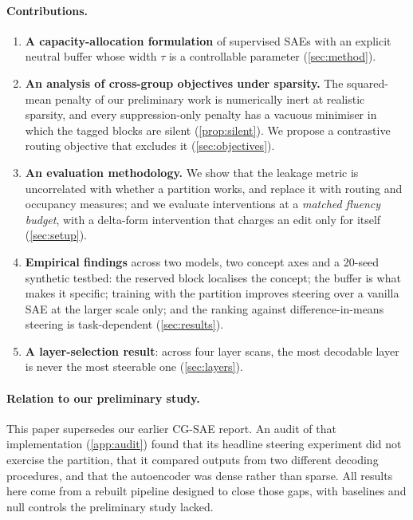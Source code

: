 \documentclass[11pt,a4paper]{article}
\theoremstyle{remark}
\begin{document}
\paragraph{Contributions.}
\begin{enumerate}
  \item \textbf{A capacity-allocation formulation} of supervised SAEs with an explicit neutral
        buffer whose width $\tau$ is a controllable parameter (\cref{sec:method}).
  \item \textbf{An analysis of cross-group objectives under sparsity.} The squared-mean penalty
        of our preliminary work is numerically inert at realistic sparsity, and every
        suppression-only penalty has a vacuous minimiser in which the tagged blocks are
        silent (\cref{prop:silent}). We propose a contrastive routing objective that excludes
        it (\cref{sec:objectives}).
  \item \textbf{An evaluation methodology.} We show that the leakage metric is uncorrelated with
        whether a partition works, and replace it with routing and occupancy measures; and we
        evaluate interventions at a \emph{matched fluency budget}, with a delta-form
        intervention that charges an edit only for itself (\cref{sec:setup}).
  \item \textbf{Empirical findings} across two models, two concept axes and a 20-seed synthetic
        testbed: the reserved block localises the concept; the buffer is what makes it
        specific; training with the partition improves steering over a vanilla SAE at the
        larger scale only; and the ranking against difference-in-means steering is task-dependent
        (\cref{sec:results}).
  \item \textbf{A layer-selection result}: across four layer scans, the most decodable layer is
        never the most steerable one (\cref{sec:layers}).
\end{enumerate}

\paragraph{Relation to our preliminary study.}
This paper supersedes our earlier CG-SAE report. An audit of that implementation
(\cref{app:audit}) found that its headline steering experiment did not exercise the partition,
that it compared outputs from two different decoding procedures, and that the autoencoder was
dense rather than sparse. All results here come from a rebuilt pipeline designed to close
those gaps, with baselines and null controls the preliminary study lacked.
\end{document}
